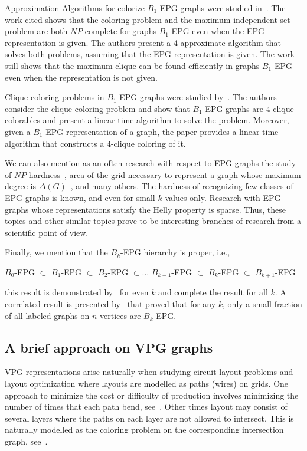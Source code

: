 Approximation Algorithms for colorize $ B_1$-EPG graphs  were studied in~\cite{epstein2013approximation}. The work cited shows that the coloring problem and the maximum independent set problem are both $ NP$-complete for graphs $ B_1$-EPG even when the EPG representation is given. The authors present a 4-approximate algorithm that solves both problems, assuming that the EPG representation is given. The work still shows that the maximum clique can be found efficiently in graphs $ B_1$-EPG even when the representation is not given.

Clique coloring problems in $B_1$-EPG graphs were studied by~\cite{bonomo2017clique}. The authors consider the clique coloring problem and show that $B_1$-EPG graphs are 4-clique-colorables and present a linear time algorithm to solve the problem. Moreover, given a $B_1$-EPG representation of a graph, the paper provides a linear time algorithm that constructs a 4-clique coloring of it.
 
We can also mention as an often research with respect to EPG graphs the study of $NP$-hardness~\cite{daniel2014b, martin2017}, area of the grid necessary to represent a graph whose maximum degree is $\Delta(G)$~\cite{Asinowski2009}, and many others. The hardness of recognizing few classes of EPG graphs is known, and even for small $ k $ values only. Research with EPG graphs whose representations satisfy the Helly property is sparse. Thus, these topics and other similar topics prove to be interesting branches of research from a scientific point of view.

Finally, we mention that the $B_k$-EPG hierarchy is proper, i.e.,

$B_0$-EPG $\subset$ $B_1$-EPG $\subset$ $B_2$-EPG $\subset \dots$ $B_{k-1}$-EPG $\subset$ $B_k$-EPG $\subset$ $B_{k+1}$-EPG 

this result is demonstrated by~\citet{biedl2010} for even $k$ and  \citet{heldt2014} complete the result for all $k$.
A correlated result is presented by~\citet{Asinowski2009} that proved that for any $k$, only a small fraction of all labeled graphs on $n$ vertices are $B_k$-EPG.

\subsection{A brief approach on VPG graphs}

VPG representations arise naturally when studying circuit layout problems
and layout optimization where layouts are modelled as paths (wires) on
grids. One approach to minimize the cost or difficulty of production involves minimizing the number of times that each path bend, see~\cite{bandy1990, molitor1991, sinden1966topology}.
Other times layout may consist of
several layers where the paths on each layer are not allowed to intersect. This is naturally modelled as the coloring problem on the corresponding intersection graph, see~\cite{Alcn2017VertexIG}.



